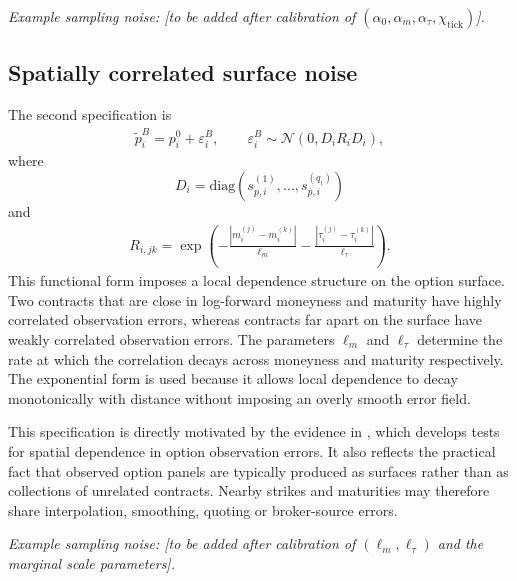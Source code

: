 \documentclass[11pt,a4paper,notitlepage]{article}
\numberwithin{equation}{section}
\begin{document}
\emph{Example sampling noise: [to be added after calibration of $(\alpha_0,\alpha_m,\alpha_\tau,\chi_{\mathrm{tick}})$].}

\subsection{Spatially correlated surface noise}
The second specification is
\begin{align}
\tilde p_i^B=p_i^0+\varepsilon_i^B,
\qquad
\varepsilon_i^B\sim\mathcal{N}(0,D_iR_iD_i),
\label{eq:app_spatial_noise}
\end{align}
where
\[
D_i=\mathrm{diag}\left(s_{p,i}^{(1)},\ldots,s_{p,i}^{(q_i)}\right)
\]
and
\begin{align}
R_{i,jk}
=
\exp\left(
-\frac{|m_i^{(j)}-m_i^{(k)}|}{\ell_m}
-\frac{|\tau_i^{(j)}-\tau_i^{(k)}|}{\ell_\tau}
\right).
\label{eq:app_spatial_kernel}
\end{align}
This functional form imposes a local dependence structure on the option surface. Two contracts that are close in
log-forward moneyness and maturity have highly correlated observation errors, whereas contracts far apart on the
surface have weakly correlated observation errors. The parameters $\ell_m$ and $\ell_\tau$ determine the rate at
which the correlation decays across moneyness and maturity respectively. The exponential form is used because it
allows local dependence to decay monotonically with distance without imposing an overly smooth error field.

This specification is directly motivated by the evidence in \citet{andersen2021spatial}, which develops tests for
spatial dependence in option observation errors. It also reflects the practical fact that observed option panels are
typically produced as surfaces rather than as collections of unrelated contracts. Nearby strikes and maturities may
therefore share interpolation, smoothing, quoting or broker-source errors.

\emph{Example sampling noise: [to be added after calibration of $(\ell_m,\ell_\tau)$ and the marginal scale parameters].}
\end{document}
